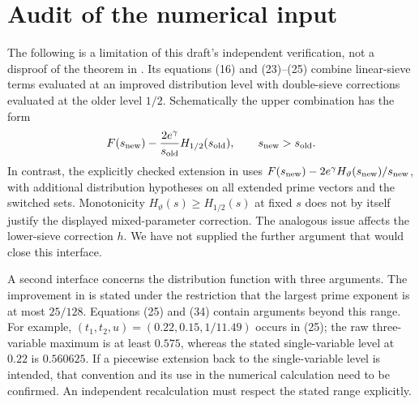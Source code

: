 \documentclass[11pt]{article}
\begin{document}
\section{Audit of the numerical input}\label{sec:input-audit}
The following is a limitation of this draft's independent verification,
not a disproof of the theorem in \cite{Li2026}.
Its equations (16) and (23)--(25) combine linear-sieve terms evaluated at
an improved distribution level with double-sieve corrections evaluated
at the older level $1/2$. Schematically the upper combination has the form
\[
 F(s_{\rm new})-\frac{2e^\gamma}{s_{\rm old}}
                      H_{1/2}(s_{\rm old}),
 \qquad s_{\rm new}>s_{\rm old}.
\]
In contrast, the explicitly checked extension in
\cite[Lemma 6.4]{Lichtman2025} uses
$F(s_{\rm new})-2e^\gamma H_{\vartheta}(s_{\rm new})/s_{\rm new}$,
with additional distribution hypotheses on all extended prime vectors
and the switched sets. Monotonicity
$H_{\vartheta}(s)\ge H_{1/2}(s)$ at fixed $s$ does not by itself justify
the displayed mixed-parameter correction. The analogous issue affects
the lower-sieve correction $h$. We have not supplied the further
argument that would close this interface.

A second interface concerns the distribution function with three
arguments. The improvement in \cite[Lemmas 2.1--2.2]{Li2026} is stated
under the restriction that the largest prime exponent is at most
$25/128$. Equations (25) and (34) contain arguments beyond this range.
For example, $(t_1,t_2,u)=(0.22,0.15,1/11.49)$ occurs in (25);
the raw three-variable maximum is at least $0.575$, whereas the stated
single-variable level at $0.22$ is $0.560625$. If a piecewise extension
back to the single-variable level is intended, that convention and its
use in the numerical calculation need to be confirmed. An independent
recalculation must respect the stated range explicitly.
\end{document}
